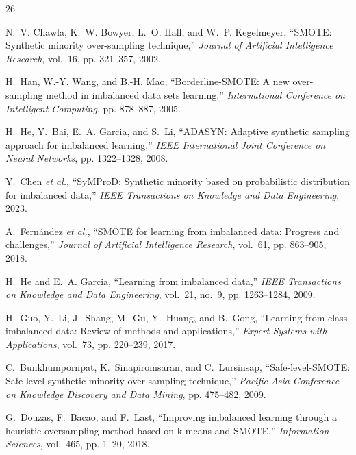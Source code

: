 \documentclass[12pt,a4paper]{article}
\theoremstyle{definition}
\begin{document}

\begin{thebibliography}{26}

N.~V. Chawla, K.~W. Bowyer, L.~O. Hall, and W.~P. Kegelmeyer,
``SMOTE: Synthetic minority over-sampling technique,''
\emph{Journal of Artificial Intelligence Research}, vol.~16, pp. 321--357, 2002.

H.~Han, W.-Y. Wang, and B.-H. Mao,
``Borderline-SMOTE: A new over-sampling method in imbalanced data sets learning,''
\emph{International Conference on Intelligent Computing}, pp. 878--887, 2005.

H.~He, Y.~Bai, E.~A. Garcia, and S.~Li,
``ADASYN: Adaptive synthetic sampling approach for imbalanced learning,''
\emph{IEEE International Joint Conference on Neural Networks}, pp. 1322--1328, 2008.

Y.~Chen \emph{et al.},
``SyMProD: Synthetic minority based on probabilistic distribution for imbalanced data,''
\emph{IEEE Transactions on Knowledge and Data Engineering}, 2023.

A.~Fern{\'a}ndez \emph{et al.},
``SMOTE for learning from imbalanced data: Progress and challenges,''
\emph{Journal of Artificial Intelligence Research}, vol.~61, pp. 863--905, 2018.

H.~He and E.~A. Garcia,
``Learning from imbalanced data,''
\emph{IEEE Transactions on Knowledge and Data Engineering}, vol.~21, no.~9, pp. 1263--1284, 2009.

H.~Guo, Y.~Li, J.~Shang, M.~Gu, Y.~Huang, and B.~Gong,
``Learning from class-imbalanced data: Review of methods and applications,''
\emph{Expert Systems with Applications}, vol.~73, pp. 220--239, 2017.

C.~Bunkhumpornpat, K.~Sinapiromsaran, and C.~Lursinsap,
``Safe-level-SMOTE: Safe-level-synthetic minority over-sampling technique,''
\emph{Pacific-Asia Conference on Knowledge Discovery and Data Mining}, pp. 475--482, 2009.

G.~Douzas, F.~Bacao, and F.~Last,
``Improving imbalanced learning through a heuristic oversampling method based on k-means and SMOTE,''
\emph{Information Sciences}, vol.~465, pp. 1--20, 2018.


\end{thebibliography}
\end{document}
